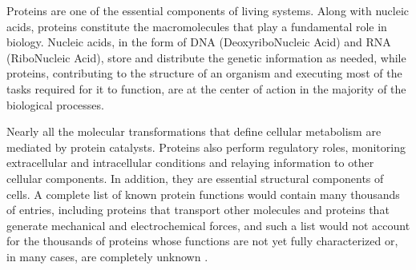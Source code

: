 
Proteins are one of the essential components of living systems. Along with nucleic acids, proteins constitute the macromolecules that play a fundamental role in biology. 
Nucleic acids, in the form of DNA (DeoxyriboNucleic Acid) and RNA (RiboNucleic Acid), store and distribute the genetic information as needed, while proteins, contributing to the structure of an organism and executing most of the tasks required for it to function, are at the center of action in the majority of the biological processes.
 
Nearly all the molecular transformations that define cellular metabolism are mediated by protein catalysts. Proteins also perform regulatory roles, monitoring extracellular and intracellular conditions and relaying information to other cellular components. In addition, they are essential structural components of cells.
A complete list of known protein functions would contain many thousands of entries, including proteins that transport other molecules and proteins that generate mechanical and electrochemical forces, and such a list would not account for the thousands of proteins whose functions are not yet fully characterized or, in many cases, are completely unknown
\cite{voet2016fundamentals}.

